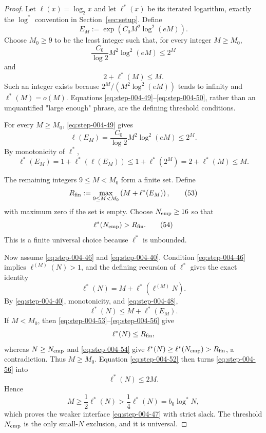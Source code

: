 \begin{proof}

Let \(\ell(x)=\log_2 x\) and let \(\ell^*(x)\) be its iterated logarithm, exactly the \(\log^*\) convention in Section~\ref{sec:setup}. Define
\[
E_M:=\exp\!\left(C_0M^2\log^2(eM)\right).
\tag{48}\label{eq:step-004-48}
\]
Choose \(M_0\ge 9\) to be the least integer such that, for every integer \(M\ge M_0\),
\[
\frac{C_0}{\log2}M^2\log^2(eM)\le2^M
\tag{49}\label{eq:step-004-49}
\]
and
\[
2+\ell^*(M)\le M.
\tag{50}\label{eq:step-004-50}
\]
Such an integer exists because \(2^M/(M^2 \log^2(eM))\) tends to infinity and \(\ell^*(M)=o(M)\). Equations \eqref{eq:step-004-49}--\eqref{eq:step-004-50}, rather than an unquantified "large enough" phrase, are the defining threshold conditions.

For every \(M\ge M_0\), \eqref{eq:step-004-49} gives
\[
\ell(E_M)
=\frac{C_0}{\log2}M^2\log^2(eM)
\le2^M.
\tag{51}\label{eq:step-004-51}
\]
By monotonicity of \(\ell^*\),
\[
\ell^*(E_M)
=1+\ell^*(\ell(E_M))
\le1+\ell^*(2^M)
=2+\ell^*(M)
\le M.
\tag{52}\label{eq:step-004-52}
\]

The remaining integers \(9\le M<M_0\) form a finite set. Define
\[
R_{\rm fin}
:=\max_{9\le M<M_0}
\left(M+\ell^*(E_M)\right),
\tag{53}\label{eq:step-004-53}
\]
with maximum zero if the set is empty. Choose \(N_{\rm emp}\ge 16\) so that
\[
\ell^*(N_{\rm emp})>R_{\rm fin}.
\tag{54}\label{eq:step-004-54}
\]
This is a finite universal choice because \(\ell^*\) is unbounded.

Now assume \eqref{eq:step-004-46} and \eqref{eq:step-004-40}. Condition \eqref{eq:step-004-46} implies \(\ell^{(M)}(N)>1\), and the defining recursion of \(\ell^*\) gives the exact identity
\[
\ell^*(N)=M+\ell^*(\ell^{(M)}N).
\tag{55}\label{eq:step-004-55}
\]
By \eqref{eq:step-004-40}, monotonicity, and \eqref{eq:step-004-48},
\[
\ell^*(N)\le M+\ell^*(E_M).
\tag{56}\label{eq:step-004-56}
\]
If \(M<M_0\), then \eqref{eq:step-004-53}--\eqref{eq:step-004-56} give
\[
\ell^*(N)\le R_{\rm fin},
\]
whereas \(N\ge N_{\rm emp}\) and \eqref{eq:step-004-54} give
\(\ell^*(N)\ge \ell^*(N_{\rm emp})>R_{\rm fin}\), a contradiction. Thus \(M\ge M_0\). Equation \eqref{eq:step-004-52} then turns \eqref{eq:step-004-56} into
\[
\ell^*(N)\le2M.
\tag{57}\label{eq:step-004-57}
\]
Hence
\[
M\ge\frac12\ell^*(N)>\frac14\ell^*(N)=b_0\log^*N,
\tag{58}\label{eq:step-004-58}
\]
which proves the weaker interface \eqref{eq:step-004-47} with strict slack. The threshold \(N_{\rm emp}\) is the only small-\(N\) exclusion, and it is universal.

\end{proof}


